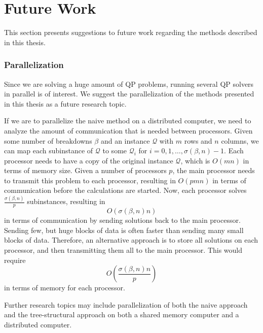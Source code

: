 \documentclass[a4paper,12pt]{report}
\begin{document}
\section{Future Work}
This section presents suggestions to future work regarding the methods
described in this thesis.

\subsubsection{Parallelization}
Since we are solving a huge amount of QP problems, running several QP solvers
in parallel is of interest. We suggest the parallelization of the methods
presented in this thesis as a future research topic.


If we are to parallelize the naive method on a distributed computer, we need to
analyze the amount of communication that is needed between processors.
Given some number of breakdowns $\beta$ and an instance $\mathcal{Q}$ with
$m$ rows and $n$ columns, we can map each subinstance of $\mathcal{Q}$ to some
$\mathcal{Q}_i$ for $i=0,1,\ldots,\sigma(\beta,n) - 1$. Each processor needs to
have a copy of the original instance $\mathcal{Q}$, which is $O(mn)$ in terms
of memory size. Given a number of processors $p$, the main processor needs to
transmit this problem to each processor, resulting in $O(pmn)$ in terms of
communication before the calculations are started. Now, each
processor solves $\frac{\sigma(\beta, n)}{p}$ subinstances, resulting in
\[
O(\sigma(\beta, n)n)
\]
in terms of communication by sending solutions back to the main processor.
Sending few, but huge blocks of data is often faster than sending many small
blocks of data.
Therefore, an alternative approach is to store all solutions on each processor,
and then transmitting them all to the main processor.
This would require
\[
O\left(\frac{\sigma(\beta, n)n}{p}\right)
\]
in terms of memory for each processor.

Further research topics may include parallelization of both the naive approach
and the tree-structural approach on both a shared memory computer and a
distributed computer.


{}


\onecolumn

\end{document}
